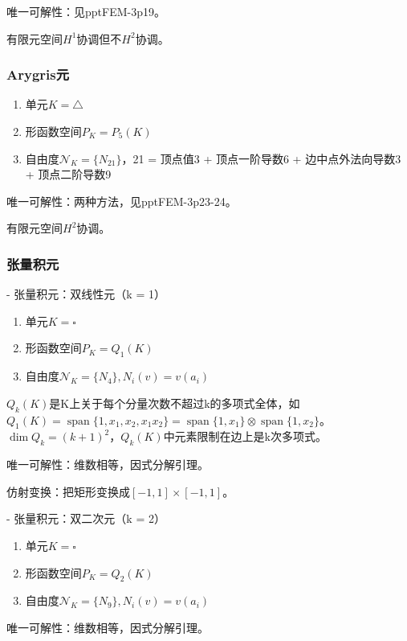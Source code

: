 唯一可解性：见pptFEM-3p19。

有限元空间$H^1$协调但不$H^2$协调。

\subsubsection{Arygris元}

\begin{enumerate}
  \item 单元$K = \triangle$
  \item 形函数空间$P_K = P_5(K)$
  \item 自由度$\mathcal{N}_K = \{N_{21}\}$，21 = 顶点值3 + 顶点一阶导数6 + 边中点外法向导数3 + 顶点二阶导数9
\end{enumerate}

唯一可解性：两种方法，见pptFEM-3p23-24。

有限元空间$H^2$协调。

\subsubsection{张量积元}

- 张量积元：双线性元（k = 1）

\begin{enumerate}
  \item 单元$K = \square$
  \item 形函数空间$P_K = Q_1(K)$
  \item 自由度$\mathcal{N}_K = \{N_{4}\}, N_i(v) = v(a_i)$
\end{enumerate}

$Q_{k}(K)$是K上关于每个分量次数不超过k的多项式全体，如$Q_1(K) = \operatorname{span}\{1, x_1, x_2, x_1x_2\} = \operatorname{span}\{1, x_1\} \otimes \operatorname{span}\{1, x_2\}$。$\operatorname{dim} Q_{k}=(k+1)^{2}$，$Q_{k}(K)$中元素限制在边上是k次多项式。

唯一可解性：维数相等，因式分解引理。

仿射变换：把矩形变换成$[-1, 1] \times [-1, 1]$。

- 张量积元：双二次元（k = 2）

\begin{enumerate}
  \item 单元$K = \square$
  \item 形函数空间$P_K = Q_2(K)$
  \item 自由度$\mathcal{N}_K = \{N_{9}\}, N_i(v) = v(a_i)$
\end{enumerate}

唯一可解性：维数相等，因式分解引理。

